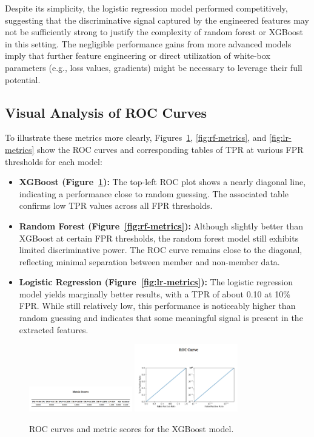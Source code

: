 \documentclass[12pt]{article}
\begin{document}
Despite its simplicity, the logistic regression model performed competitively, suggesting that the discriminative signal captured by the engineered features may not be sufficiently strong to justify the complexity of random forest or XGBoost in this setting. The negligible performance gains from more advanced models imply that further feature engineering or direct utilization of white-box parameters (e.g., loss values, gradients) might be necessary to leverage their full potential.

\subsection{Visual Analysis of ROC Curves}
To illustrate these metrics more clearly, Figures~\ref{fig:xgb-metrics}, \ref{fig:rf-metrics}, and \ref{fig:lr-metrics} show the ROC curves and corresponding tables of TPR at various FPR thresholds for each model:
\begin{itemize}
    \item \textbf{XGBoost (Figure~\ref{fig:xgb-metrics}):}  
    The top-left ROC plot shows a nearly diagonal line, indicating a performance close to random guessing. The associated table confirms low TPR values across all FPR thresholds.

    \item \textbf{Random Forest (Figure~\ref{fig:rf-metrics}):}  
    Although slightly better than XGBoost at certain FPR thresholds, the random forest model still exhibits limited discriminative power. The ROC curve remains close to the diagonal, reflecting minimal separation between member and non-member data.

    \item \textbf{Logistic Regression (Figure~\ref{fig:lr-metrics}):}  
    The logistic regression model yields marginally better results, with a TPR of about 0.10 at 10\% FPR. While still relatively low, this performance is noticeably higher than random guessing and indicates that some meaningful signal is present in the extracted features.
\end{itemize}

\begin{figure}[h!]
    \centering
    \includegraphics[width=0.4\textwidth]{xgboost_left.png}
    \includegraphics[width=0.4\textwidth]{xgboost_right.png}
    \caption{ROC curves and metric scores for the XGBoost model.}
    \label{fig:xgb-metrics}
\end{figure}
\end{document}

